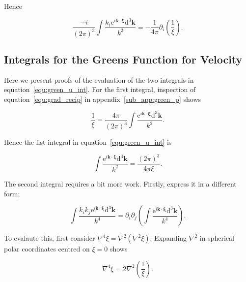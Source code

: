 \documentclass[12pt]{article}
\begin{document}
Hence

\begin{equation}
\label{equ:green_p_ident}
\frac{-i}{(2 \pi)^{3}} \int \frac{ k_{i} \mathrm{e}^{i \boldsymbol{k} \cdot \boldsymbol{\xi}} \mathrm{d}^{3} \boldsymbol{k}}{k^{2}} = -\frac{1}{4 \pi} \partial_{i} \left(\frac{1}{\xi}\right) .
\end{equation}

\subsection{Integrals for the Greens Function for Velocity}
\label{sub_app:green_vel}

Here we present proofs of the evaluation of the two integrals in equation~\ref{equ:green_u_int}. For the first integral, inspection of equation~\ref{equ:grad_recip} in appendix~\ref{sub_app:green_p} shows

\begin{equation}
\label{equ:recip_int}
\frac{1}{\xi} = \frac{4 \pi}{(2 \pi)^{3}} \int \frac{\mathrm{e}^{i \boldsymbol{k} \cdot \boldsymbol{\xi}} \mathrm{d}^{3} \boldsymbol{k}}{k^{2}} .
\end{equation}

Hence the fist integral in equation~\ref{equ:green_u_int} is

\begin{equation}
\label{equ:green_u_int1}
\int \frac{\mathrm{e}^{i \boldsymbol{k} \cdot \boldsymbol{\xi}} \mathrm{d}^{3} \boldsymbol{k}}{k^{2}} = \frac{(2 \pi)^{3}}{4 \pi \xi} .
\end{equation}

The second integral requires a bit more work. Firstly, express it in a different form;

\begin{equation}
\label{equ:green_u_int2_new}
\int \frac{k_{i} k_{j} \mathrm{e}^{i \boldsymbol{k} \cdot \boldsymbol{\xi}} \mathrm{d}^{3} \boldsymbol{k}}{k^{4}} = \partial_{i} \partial_{j} \left(\int \frac{\mathrm{e}^{i \boldsymbol{k} \cdot \boldsymbol{\xi}} \mathrm{d}^{3} \boldsymbol{k}}{k^{4}} \right) .
\end{equation}

To evalaute this, first consider $\nabla^{4} \xi = \nabla^{2}(\nabla^{2} \xi)$. Expanding $\nabla^{2}$ in spherical polar coordinates centred on $\xi = 0$ shows

\begin{equation}
\label{equ:del4}
\nabla^{4} \xi = 2 \nabla^{2} \left(\frac{1}{\xi}\right) .
\end{equation}
\end{document}
